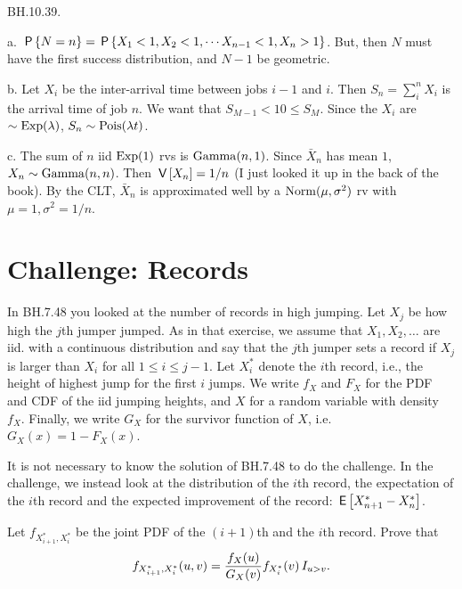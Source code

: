 \begin{exercise}
BH.10.39.
\begin{solution}
a.
 $\P{N=n} = \P{X_1 < 1, X_2<1, \cdots X_{n-1}<1, X_n>1}$. But, then $N$ must have the  first success distribution, and $N-1$ be geometric.


b.
Let $X_i$ be the inter-arrival time between jobs $i-1$ and $i$. Then $S_n=\sum_i^n X_i$ is the arrival time of job $n$. We want that $S_{M-1} < 10 \leq S_M$. Since the $X_i$ are $\sim \Exp{\lambda}$, $S_n \sim \Pois{\lambda t}$.

c.  The sum of $n$ iid $\Exp{1}$ rvs is $\Gamm{n,1}$. Since $\bar X_{n}$ has mean $1$, $X_{n} \sim \Gamm{n,n}$. Then $\V{X_n} = 1/n$ (I just looked it up in the back of the book).  By the CLT, $\bar X_n$ is approximated well by a $\Norm{\mu, \sigma^{2}}$ rv with $\mu=1, \sigma^2=1/n$.

\end{solution}
\end{exercise}



\section{Challenge: Records}
\label{sec:records}


In BH.7.48 you looked at the number of records in high jumping.
Let $X_j$ be how high the $j$th jumper jumped.
As in that exercise, we assume that $X_1, X_2, \ldots$ are iid.
with a continuous distribution and say that the $j$th jumper sets a record if $X_j$ is larger than $X_i$ for all $1\leq i \leq j-1$.
Let $X_i^*$ denote the $i$th record, i.e., the height of highest jump for the first $i$ jumps.
We write $f_X$ and $F_X$ for the PDF and CDF of the iid
jumping heights, and $X$ for a random variable with density $f_X$.
Finally, we write $G_X$ for the survivor function of $X$, i.e.
$G_X(x) = 1-F_X(x)$.

It is not necessary to know the solution of BH.7.48 to do the challenge. In the challenge, we instead look at the distribution of the $i$th record, the expectation of the $i$th record and the expected improvement of the record: $\E{X_{n+1}^* - X_n^*}$.


\begin{exercise}
Let $f_{X_{i+1}^*, X_i^*}$ be the joint PDF of the $(i+1)$th and the $i$th record.
Prove that $$f_{X_{i+1}^*, X_i^*}(u,v) = \frac{f_X(u)}{G_X(v)} f_{X_i^*}(v) \1{u >v}.$$
\end{exercise}

